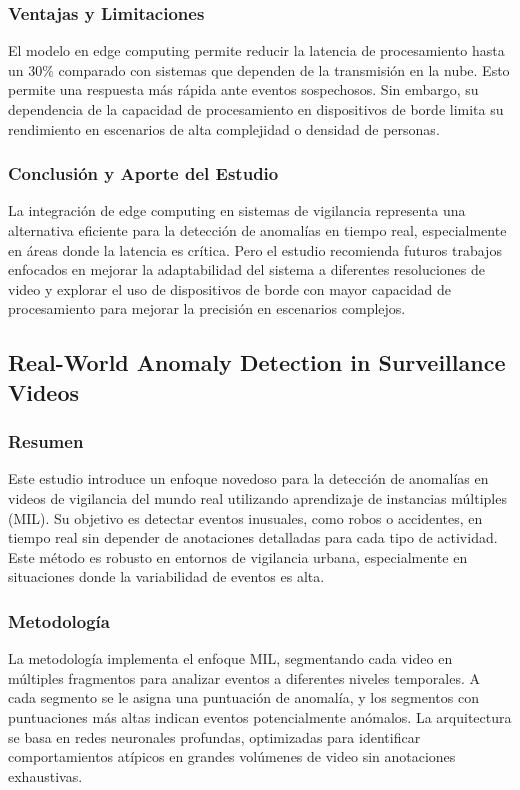 \documentclass[listof=nochaptergap,12pt,times,authoryear]{report}
\begin{document}
\subsubsection{Ventajas y Limitaciones}
El modelo en edge computing permite reducir la latencia de procesamiento hasta un 30\% comparado con sistemas que dependen de la transmisión en la nube. Esto permite una respuesta más rápida ante eventos sospechosos. Sin embargo, su dependencia de la capacidad de procesamiento en dispositivos de borde limita su rendimiento en escenarios de alta complejidad o densidad de personas.


\subsubsection{Conclusión y Aporte del Estudio}
La integración de edge computing en sistemas de vigilancia representa una alternativa eficiente para la detección de anomalías en tiempo real, especialmente en áreas donde la latencia es crítica. Pero el estudio recomienda futuros trabajos enfocados en mejorar la adaptabilidad del sistema a diferentes resoluciones de video y explorar el uso de dispositivos de borde con mayor capacidad de procesamiento para mejorar la precisión en escenarios complejos.





\subsection{Real-World Anomaly Detection in Surveillance Videos}

\subsubsection{Resumen}
Este estudio introduce un enfoque novedoso para la detección de anomalías en videos de vigilancia del mundo real utilizando aprendizaje de instancias múltiples (MIL). Su objetivo es detectar eventos inusuales, como robos o accidentes, en tiempo real sin depender de anotaciones detalladas para cada tipo de actividad. Este método es robusto en entornos de vigilancia urbana, especialmente en situaciones donde la variabilidad de eventos es alta. 

\subsubsection{Metodología}
La metodología implementa el enfoque MIL, segmentando cada video en múltiples fragmentos para analizar eventos a diferentes niveles temporales. A cada segmento se le asigna una puntuación de anomalía, y los segmentos con puntuaciones más altas indican eventos potencialmente anómalos. La arquitectura se basa en redes neuronales profundas, optimizadas para identificar comportamientos atípicos en grandes volúmenes de video sin anotaciones exhaustivas.
\end{document}
